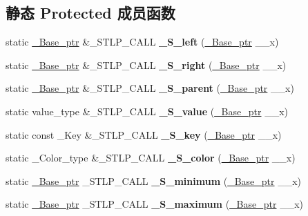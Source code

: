 \subsection*{静态 Protected 成员函数}
\begin{DoxyCompactItemize}
\item 
\mbox{\label{class___rb__tree_a09cd2da00285d7864adcfd5f497bc5df}} 
static \hyperlink{struct___rb__tree__node__base}{\+\_\+\+Base\+\_\+ptr} \&\+\_\+\+S\+T\+L\+P\+\_\+\+C\+A\+LL {\bfseries \+\_\+\+S\+\_\+left} (\hyperlink{struct___rb__tree__node__base}{\+\_\+\+Base\+\_\+ptr} \+\_\+\+\_\+x)
\item 
\mbox{\label{class___rb__tree_a0b3c5ac442760c04071974d5dea724a1}} 
static \hyperlink{struct___rb__tree__node__base}{\+\_\+\+Base\+\_\+ptr} \&\+\_\+\+S\+T\+L\+P\+\_\+\+C\+A\+LL {\bfseries \+\_\+\+S\+\_\+right} (\hyperlink{struct___rb__tree__node__base}{\+\_\+\+Base\+\_\+ptr} \+\_\+\+\_\+x)
\item 
\mbox{\label{class___rb__tree_a2e382bb61279f741bd87acf0592fcfcc}} 
static \hyperlink{struct___rb__tree__node__base}{\+\_\+\+Base\+\_\+ptr} \&\+\_\+\+S\+T\+L\+P\+\_\+\+C\+A\+LL {\bfseries \+\_\+\+S\+\_\+parent} (\hyperlink{struct___rb__tree__node__base}{\+\_\+\+Base\+\_\+ptr} \+\_\+\+\_\+x)
\item 
\mbox{\label{class___rb__tree_a5a45da543c9ca2ac470da2c7f850acd4}} 
static value\+\_\+type \&\+\_\+\+S\+T\+L\+P\+\_\+\+C\+A\+LL {\bfseries \+\_\+\+S\+\_\+value} (\hyperlink{struct___rb__tree__node__base}{\+\_\+\+Base\+\_\+ptr} \+\_\+\+\_\+x)
\item 
\mbox{\label{class___rb__tree_a6fc8da7cf20228c5ad329c530539488f}} 
static const \+\_\+\+Key \&\+\_\+\+S\+T\+L\+P\+\_\+\+C\+A\+LL {\bfseries \+\_\+\+S\+\_\+key} (\hyperlink{struct___rb__tree__node__base}{\+\_\+\+Base\+\_\+ptr} \+\_\+\+\_\+x)
\item 
\mbox{\label{class___rb__tree_a4e6477a4a2f614686ecc27ab982b1f7d}} 
static \+\_\+\+Color\+\_\+type \&\+\_\+\+S\+T\+L\+P\+\_\+\+C\+A\+LL {\bfseries \+\_\+\+S\+\_\+color} (\hyperlink{struct___rb__tree__node__base}{\+\_\+\+Base\+\_\+ptr} \+\_\+\+\_\+x)
\item 
\mbox{\label{class___rb__tree_a5741a2cc9b4afff8af00d1f614331c43}} 
static \hyperlink{struct___rb__tree__node__base}{\+\_\+\+Base\+\_\+ptr} \+\_\+\+S\+T\+L\+P\+\_\+\+C\+A\+LL {\bfseries \+\_\+\+S\+\_\+minimum} (\hyperlink{struct___rb__tree__node__base}{\+\_\+\+Base\+\_\+ptr} \+\_\+\+\_\+x)
\item 
\mbox{\label{class___rb__tree_ae9bc9e28fa9b0446570c832e9dabbe14}} 
static \hyperlink{struct___rb__tree__node__base}{\+\_\+\+Base\+\_\+ptr} \+\_\+\+S\+T\+L\+P\+\_\+\+C\+A\+LL {\bfseries \+\_\+\+S\+\_\+maximum} (\hyperlink{struct___rb__tree__node__base}{\+\_\+\+Base\+\_\+ptr} \+\_\+\+\_\+x)
\end{DoxyCompactItemize}
